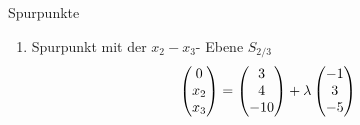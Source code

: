 \begin{bsp}{Spurpunkte}{}
\begin{enumerate}
        \[\begin{aligned}
            \begin{pmatrix}
            x_1\\0\\x_3
        \end{pmatrix} = \begin{pmatrix}
        3\\4\\-10
    \end{pmatrix} + \lambda \begin{pmatrix}
        -1\\3\\-5
    \end{pmatrix} \hspace{0.2cm}
    \text{aus der zweiten Zeile folgt \hspace{0.2cm}} \lambda = -\dfrac{4}{3}  
        \end{aligned}\]
                Damit folgt für den Spurpunkt \(S_{1/3} = \begin{pmatrix}
            3\\4\\-10
        \end{pmatrix} -\dfrac{4}{3} \begin{pmatrix}
            -1\\3\\-5
        \end{pmatrix} = \begin{pmatrix}
            \frac{13}{3}\\0\\-\frac{10}{3}
        \end{pmatrix}\)
        \item Spurpunkt mit der \(x_2- x_3\)- Ebene \(S_{2/3}\) 
        \[\begin{aligned}
            \begin{pmatrix}
            0\\x_2\\x_3
        \end{pmatrix} = \begin{pmatrix}
        3\\4\\-10
    \end{pmatrix} + \lambda \begin{pmatrix}
        -1\\3\\-5
    \end{pmatrix} \hspace{0.2cm}

\end{aligned}\]
\end{enumerate}
\end{bsp}
